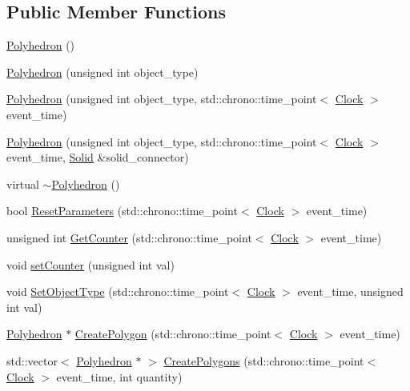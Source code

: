 \subsection*{Public Member Functions}
\begin{DoxyCompactItemize}
\item 
\hyperlink{class_polyhedron_aebdf7ee85eb636069bf93afb4e6a483f}{Polyhedron} ()
\item 
\hyperlink{class_polyhedron_a304950efef7fb67203d8136578b42535}{Polyhedron} (unsigned int object\+\_\+type)
\item 
\hyperlink{class_polyhedron_a29a4fff595cdb6a557e5f62255e61192}{Polyhedron} (unsigned int object\+\_\+type, std\+::chrono\+::time\+\_\+point$<$ \hyperlink{universe_8h_a0ef8d951d1ca5ab3cfaf7ab4c7a6fd80}{Clock} $>$ event\+\_\+time)
\item 
\hyperlink{class_polyhedron_af5bb1d2a6b04502dfdbfc9f04aafc950}{Polyhedron} (unsigned int object\+\_\+type, std\+::chrono\+::time\+\_\+point$<$ \hyperlink{universe_8h_a0ef8d951d1ca5ab3cfaf7ab4c7a6fd80}{Clock} $>$ event\+\_\+time, \hyperlink{class_solid}{Solid} \&solid\+\_\+connector)
\item 
virtual \hyperlink{class_polyhedron_a3ad3df8be901a55ddcd97128ac890473}{$\sim$\+Polyhedron} ()
\item 
bool \hyperlink{class_polyhedron_ae90c347cfb8ca8028a260e88bef2b45c}{Reset\+Parameters} (std\+::chrono\+::time\+\_\+point$<$ \hyperlink{universe_8h_a0ef8d951d1ca5ab3cfaf7ab4c7a6fd80}{Clock} $>$ event\+\_\+time)
\item 
unsigned int \hyperlink{class_polyhedron_a021ec67f2040f8ec26df64e4b9370521}{Get\+Counter} (std\+::chrono\+::time\+\_\+point$<$ \hyperlink{universe_8h_a0ef8d951d1ca5ab3cfaf7ab4c7a6fd80}{Clock} $>$ event\+\_\+time)
\item 
void \hyperlink{class_polyhedron_ad74a1ccc28a08bc2dbc186e5f2c1f694}{set\+Counter} (unsigned int val)
\item 
void \hyperlink{class_polyhedron_a014c8f981aef5fa1d70dcb5be6a0875a}{Set\+Object\+Type} (std\+::chrono\+::time\+\_\+point$<$ \hyperlink{universe_8h_a0ef8d951d1ca5ab3cfaf7ab4c7a6fd80}{Clock} $>$ event\+\_\+time, unsigned int val)
\item 
\hyperlink{class_polyhedron}{Polyhedron} $\ast$ \hyperlink{class_polyhedron_ae5852dd26065d9f38ed293f8d95106ad}{Create\+Polygon} (std\+::chrono\+::time\+\_\+point$<$ \hyperlink{universe_8h_a0ef8d951d1ca5ab3cfaf7ab4c7a6fd80}{Clock} $>$ event\+\_\+time)
\item 
std\+::vector$<$ \hyperlink{class_polyhedron}{Polyhedron} $\ast$ $>$ \hyperlink{class_polyhedron_a1848eb8747c1132c40c2d27336af2896}{Create\+Polygons} (std\+::chrono\+::time\+\_\+point$<$ \hyperlink{universe_8h_a0ef8d951d1ca5ab3cfaf7ab4c7a6fd80}{Clock} $>$ event\+\_\+time, int quantity)

\end{DoxyCompactItemize}
